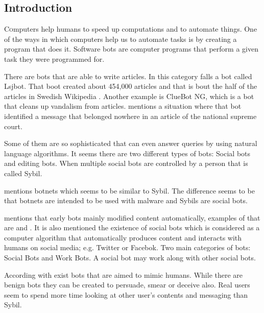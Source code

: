 \documentclass[twoside]{article}
\begin{document}
\begin{multicols}{2} %

\section{Introduction}
\lettrine[nindent=0em,lines=3]{C}omputers help humans to speed up computations and to automate things. One of the ways in which
computers help us to automate tasks is by creating a program that does it. Software bots are computer programs that perform a given 
task they were programmed for. 

There are bots that are able to write articles. In this category falls a bot called Lsjbot. That boot created about 454,000 articles and that
is bout the half of the articles in Swedish Wikipedia \cite{guld:2013}. Another example is ClueBot NG, which is a bot that cleans up
vandalism from articles. \cite{bbc07:2012} mentions a situation where that bot identified a message that belonged nowhere in an article
of the national supreme court.

Some of them are so sophisticated that can even answer queries by using natural language algorithms\cite{emerging:2014}. It seems
there are two different types of bots: Social bots and editing bots. When multiple social bots are controlled by a person that is called
Sybil\cite{ferrara:2015}.

\cite{kuhn:2015} mentions botnets which seems to be similar to Sybil. The difference seems to be that botnets are intended to be
used with malware and Sybils are social bots.

\cite{ferrara:2015} mentions that early bots mainly modified content automatically, examples of that are \cite{wikiWriter:2014} and \cite{wikiList:2014}. It is also mentioned the existence of social bots which is considered as a computer algorithm that automatically produces content and interacts with humans on social media; e.g. Twitter or Facebok.
Two main categories of bots: Social Bots and Work Bots. A social bot may work along with other social bots.

According with \cite{ferrara:2015} exist bots that are aimed to mimic humans. While there are benign bots they can be created to persuade, smear or deceive also. 
Real users seem to spend more time looking at other user's contents and messaging than Sybil.


\end{multicols}
\end{document}
